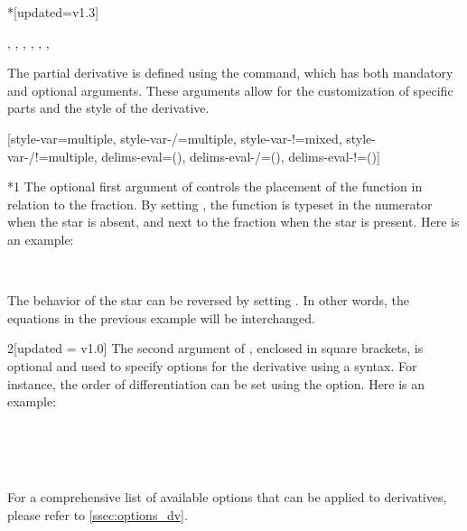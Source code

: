 \begin{function}*{\pdv}[updated=v1.3]
	\begin{syntax}
		\sarg, , , \targ{/}, \targ{!}, , 
	\end{syntax}
	The partial derivative is defined using the  command, which has both mandatory and optional arguments. These arguments allow for the customization of specific parts and the style of the derivative.
	\begin{definition}
		\DeclareDerivative{\pdv}{\partial}[style-var=multiple, style-var-/=multiple,
		style-var-!=mixed, style-var-/!=multiple, delims-eval=(), delims-eval-/=(),
		delims-eval-!=()]
	\end{definition}
	
	\begin{argument}*{1}
		The optional first argument of  controls the placement of the function in relation to the fraction. By setting , the function is typeset in the numerator when the star is absent, and next to the fraction when the star is present. Here is an example:
		\begin{example}
			 \\
		\end{example}
		The behavior of the star can be reversed by setting . In other words, the equations in the previous example will be interchanged.
	\end{argument}
	
	\begin{argument}{2}[updated = v1.0]
		The second argument of , enclosed in square brackets, is optional and used to specify options for the derivative using a  syntax. For instance, the order of differentiation can be set using the  option. Here is an example:
		\begin{example}
			\pdv[order={2,3}]{f}{x,y,z} \\
			\pdv[order={\beta,a,n+2a}]{f}{x,y,z} \\
			\pdv[order={2,n^2,n^2-1}]{f}{x,y,z} \\
			\pdv[order={3/2-n/3,n/2,1/3}]{f}{x,y,z}
		\end{example}
		For a comprehensive list of available options that can be applied to derivatives, please refer to \cref{ssec:options_dv}.
	\end{argument}
	

\end{function}
